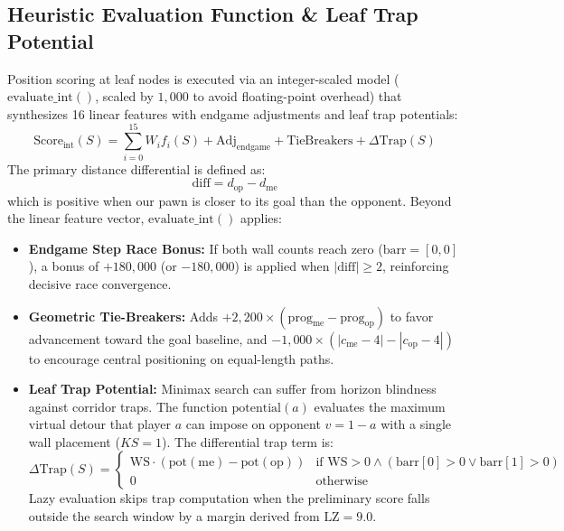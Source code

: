 \subsection{Heuristic Evaluation Function \& Leaf Trap Potential}
Position scoring at leaf nodes is executed via an integer-scaled model ($\text{evaluate\_int}()$, scaled by $1{,}000$ to avoid floating-point overhead) that synthesizes 16 linear features with endgame adjustments and leaf trap potentials:
\begin{equation}
    \text{Score}_{\text{int}}(S) = \sum_{i=0}^{15} W_i f_i(S) + \text{Adj}_{\text{endgame}} + \text{TieBreakers} + \Delta \text{Trap}(S)
\end{equation}
The primary distance differential is defined as:
\begin{equation}
    \text{diff} = d_{\text{op}} - d_{\text{me}}
\end{equation}
which is positive when our pawn is closer to its goal than the opponent. Beyond the linear feature vector, $\text{evaluate\_int}()$ applies:
\begin{itemize}[leftmargin=1.5em]
    \item \textbf{Endgame Step Race Bonus:} If both wall counts reach zero ($\text{barr} = [0, 0]$), a bonus of $+180{,}000$ (or $-180{,}000$) is applied when $|\text{diff}| \ge 2$, reinforcing decisive race convergence.
    \item \textbf{Geometric Tie-Breakers:} Adds $+2{,}200 \times (\text{prog}_{\text{me}} - \text{prog}_{\text{op}})$ to favor advancement toward the goal baseline, and $-1{,}000 \times (|c_{\text{me}} - 4| - |c_{\text{op}} - 4|)$ to encourage central positioning on equal-length paths.
    \item \textbf{Leaf Trap Potential:} Minimax search can suffer from horizon blindness against corridor traps. The function $\text{potential}(a)$ evaluates the maximum virtual detour that player $a$ can impose on opponent $v = 1 - a$ with a single wall placement ($KS = 1$). The differential trap term is:
    \begin{equation}
        \Delta \text{Trap}(S) = \begin{cases}
            \text{WS} \cdot (\text{pot}(\text{me}) - \text{pot}(\text{op})) & \text{if } \text{WS} > 0 \land (\text{barr}[0] > 0 \lor \text{barr}[1] > 0) \\
            0 & \text{otherwise}
        \end{cases}
    \end{equation}
    Lazy evaluation skips trap computation when the preliminary score falls outside the search window by a margin derived from $\text{LZ} = 9.0$.
\end{itemize}

